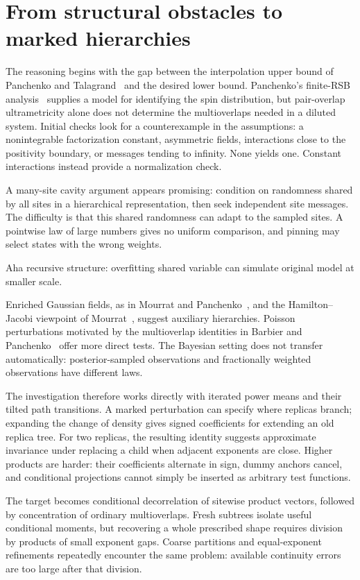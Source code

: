 \documentclass[11pt,letterpaper]{article}
\newcommand{\QuoteSource}[1]{\par\Needspace{4\baselineskip}\smallskip\noindent{\footnotesize\sffamily\color{accent}VERBATIM EXCERPT}\par\nobreak}
\begin{document}
\section{From structural obstacles to marked hierarchies}
The reasoning begins with the gap between the interpolation upper bound of Panchenko and Talagrand~\cite{PT} and the desired lower bound. Panchenko's finite-RSB analysis~\cite{P} supplies a model for identifying the spin distribution, but pair-overlap ultrametricity alone does not determine the multioverlaps needed in a diluted system. Initial checks look for a counterexample in the assumptions: a nonintegrable factorization constant, asymmetric fields, interactions close to the positivity boundary, or messages tending to infinity. None yields one. Constant interactions instead provide a normalization check.

A many-site cavity argument appears promising: condition on randomness shared by all sites in a hierarchical representation, then seek independent site messages. The difficulty is that this shared randomness can adapt to the sampled sites. A pointwise law of large numbers gives no uniform comparison, and pinning may select states with the wrong weights.
\QuoteSource{}
\begin{CoTQuote}
Aha recursive structure: overfitting shared variable can simulate original model at smaller scale.
\end{CoTQuote}
Enriched Gaussian fields, as in Mourrat and Panchenko~\cite{MP}, and the Hamilton--Jacobi viewpoint of Mourrat~\cite{M}, suggest auxiliary hierarchies. Poisson perturbations motivated by the multioverlap identities in Barbier and Panchenko~\cite{BP} offer more direct tests. The Bayesian setting does not transfer automatically: posterior-sampled observations and fractionally weighted observations have different laws.

The investigation therefore works directly with iterated power means and their tilted path transitions. A marked perturbation can specify where replicas branch; expanding the change of density gives signed coefficients for extending an old replica tree. For two replicas, the resulting identity suggests approximate invariance under replacing a child when adjacent exponents are close. Higher products are harder: their coefficients alternate in sign, dummy anchors cancel, and conditional projections cannot simply be inserted as arbitrary test functions.

The target becomes conditional decorrelation of sitewise product vectors, followed by concentration of ordinary multioverlaps. Fresh subtrees isolate useful conditional moments, but recovering a whole prescribed shape requires division by products of small exponent gaps. Coarse partitions and equal-exponent refinements repeatedly encounter the same problem: available continuity errors are too large after that division.
\end{document}
